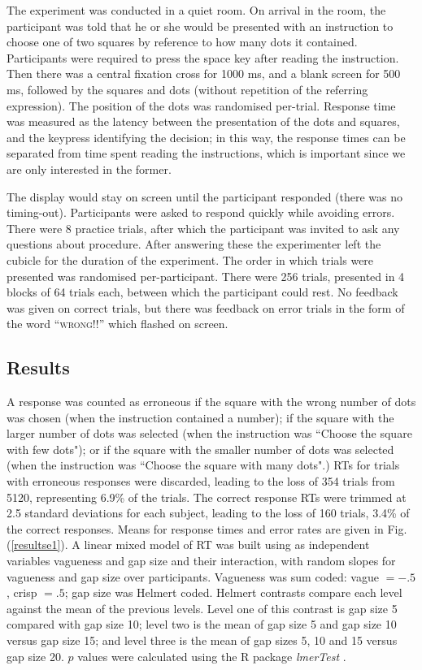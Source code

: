 The experiment was conducted in a quiet room. On arrival in the room, the participant was told that he or she would be presented with an instruction to choose one of two squares by reference to how many dots it contained. Participants were required to press the space key after reading the instruction. Then there was a central fixation cross for 1000 ms, and a blank screen for 500 ms, followed by the squares and dots (without repetition of the referring expression).  The position of the dots was randomised per-trial. Response time was measured as the latency between the presentation of the dots and squares, and the keypress identifying the decision; in this way, the response times can be separated from time spent reading the instructions, which is important since we are only interested in the former.

The display would stay on screen until the participant responded (there was no timing-out). Participants were asked to respond quickly while avoiding errors. There were 8 practice trials, after which the participant was invited to ask any questions about procedure. After answering these the experimenter left the cubicle for the duration of the experiment. The order in which trials were presented was randomised per-participant. There were 256 trials, presented in 4 blocks of 64 trials each, between which the participant could rest. No feedback was given on correct trials, but there was feedback on error trials in the form of the word ``\textsc{wrong!!}'' which flashed on screen.

\subsection{Results}

A response was counted as erroneous if the square with the wrong number of dots was chosen (when the instruction contained a number); if the square with the larger number of dots was selected (when the instruction was ``Choose the square with few dots"); or if the square with the smaller number of dots was selected (when the instruction was ``Choose the square with many dots".) %
RTs for trials with erroneous responses were discarded, leading to the loss of 354 trials from 5120, representing 6.9\% of the trials. The correct response RTs were trimmed at 2.5 standard deviations for each subject, leading to the loss of 160 trials, 3.4\% of the correct responses. Means for response times and error rates are given in Fig. (\ref{resultse1}).
A linear mixed model of RT was built using as independent variables vagueness and gap size and their interaction, with random slopes for vagueness and gap size over participants. Vagueness was sum coded: vague $= -.5$, crisp $= .5$; gap size was Helmert coded. Helmert contrasts compare each level against the mean of the previous levels. Level one of this contrast is gap size 5 compared with gap size 10; level two is the mean of gap size 5 and gap size 10 versus gap size 15; and level three is the mean of gap sizes 5, 10 and 15 versus gap size 20. 
$p$ values were calculated using the R package \emph{lmerTest} \cite{lmerTest}.

